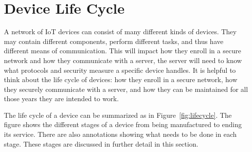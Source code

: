 \documentclass[0-thesis.tex]{subfiles}
\begin{document}
\section{Device Life Cycle}
\label{sec:device-lifecycle}
A network of IoT devices can consist of many different kinds of devices. They may contain
different components, perform different tasks, and thus have different means of
communication. This will impact how they enroll in a secure network and how they
communicate with a server, the server will need to know what protocols and security
measure a specific device handles. It is helpful to think about the life cycle of devices:
how they enroll in a secure network, how they securely communicate with a server, and how
they can be maintained for all those years they are intended to work.

The life cycle of a device can be summarized as in Figure~\ref{fig:lifecycle}. The figure
shows the different stages of a device from being manufactured to ending its service.
There are also annotations showing what needs to be done in each stage. These stages are
discussed in further detail in this section.
\end{document}
